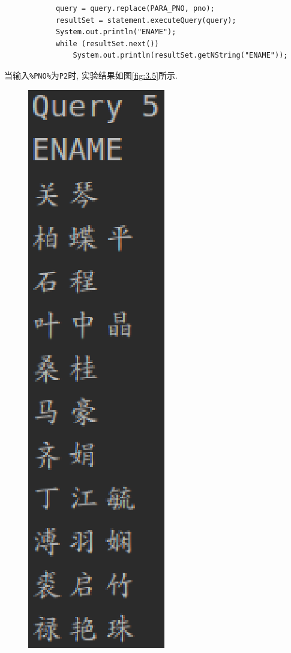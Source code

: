 \documentclass{ML}
\begin{document}
\begin{enumerate}
\begin{verbatim}
            query = query.replace(PARA_PNO, pno);
            resultSet = statement.executeQuery(query);
            System.out.println("ENAME");
            while (resultSet.next())
                System.out.println(resultSet.getNString("ENAME"));
        \end{verbatim}
    当输入\texttt{\%PNO\%}为\texttt{P2}时, 实验结果如图\ref{fig:3.5}所示.
    \begin{figure}[H]
        \centering
        \includegraphics[scale=0.4, bb=0 0 97 338]{media/3.5.eps}

\end{figure}
\end{enumerate}
\end{document}

